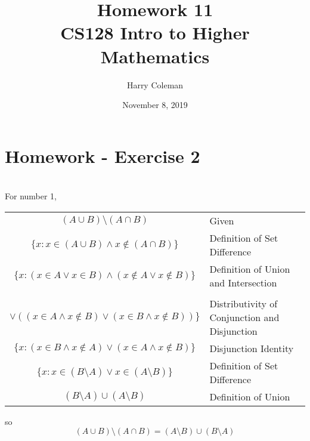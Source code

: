 \documentclass[11pt]{article}
\begin{document}
 
\title{Homework 11\\
    \large CS128 Intro to Higher Mathematics}
\author{Harry Coleman}
\date{November 8, 2019}

\maketitle

\section*{Homework - Exercise 2}
\\

For number 1,
\begin{center}
    \def\arraystretch{2}
    \begin{tabular}{c l}
        $(A \cup B) \setminus (A \cap B)$ & Given \\
        $\{x: x\in(A \cup B) \land x\notin(A \cap B)\}$ & Definition of Set Difference \\
        $\{x: (x\in A \lor x\in B) \land (x\notin A \lor x\notin B)\}$ & Definition of Union and Intersection \\
        \shortstack{$\{x: ((x\in A \land x\notin A) \lor (x\in B \land x\notin A))$\\$\lor ((x\in A \land x\notin B) \lor (x\in B \land x\notin B))\}$} & Distributivity of Conjunction and Disjunction \\
        $\{x: (x\in B \land x\notin A) \lor (x\in A \land x\notin B)\}$ & Disjunction Identity \\
        $\{x: x\in(B\setminus A) \lor x\in(A\setminus B)\}$ & Definition of Set Difference \\
        $(B\setminus A) \cup (A\setminus B)$ & Definition of Union \\
    \end{tabular}
\end{center}
so
\[(A \cup B) \setminus (A \cap B) = (A \setminus B) \cup (B \setminus A)\]
\end{document}
